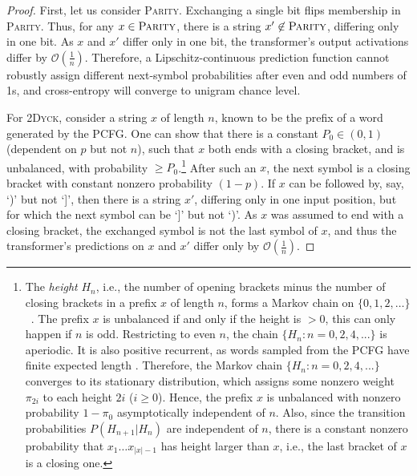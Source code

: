 \documentclass[11pt,a4paper]{article}
\begin{document}
\begin{proof}
First, let us consider \textsc{Parity}.
Exchanging a single bit flips membership in \textsc{Parity}.
Thus, for any $x \in \textsc{Parity}$, there is a string $x' \not\in \textsc{Parity}$, differing only in one bit.
As $x$ and $x'$ differ only in one bit, the transformer's output activations differ by $\mathcal{O}(\frac{1}{n})$.
Therefore, a Lipschitz-continuous prediction function cannot robustly assign different next-symbol probabilities after even and odd numbers of 1s, and cross-entropy will converge to unigram chance level.

For \textsc{2Dyck}, consider a string $x$ of length $n$, known to be the prefix of a word generated by the PCFG.
One can show that there is a constant $P_0 \in (0,1)$ (dependent on $p$ but not $n$), such that $x$ both ends with a closing bracket, and is unbalanced, with probability $\geq P_0$.\footnote{%
The \emph{height} $H_{n}$, i.e., the number of opening brackets minus the number of closing brackets in a prefix $x$ of length $n$, forms a Markov chain on $\{0, 1, 2, \dots\}$~\citep{keener1992limit}.
The prefix $x$ is unbalanced if and only if the height is $>0$, this can only happen if $n$ is odd.
Restricting to even $n$, the chain $\{H_{n} : n = 0, 2, 4, ...\}$ is aperiodic.
It is also positive recurrent, as words sampled from the PCFG have finite expected length \citep{skachkova2018closing}.
Therefore, the Markov chain $\{H_{n} : n = 0, 2, 4, ...\}$ converges to its stationary distribution, which assigns some nonzero weight $\pi_{2i}$ to each height  $2i$ ($i \geq 0$).
Hence, the prefix $x$ is unbalanced with nonzero probability $1-\pi_0$ asymptotically independent of $n$.
Also, since the transition probabilities $P(H_{n+1}|H_n)$ are independent of $n$, there is a constant nonzero probability that $x_1\dots x_{|x|-1}$ has height larger than $x$, i.e., the last bracket of $x$ is a closing one.}
After such an $x$, the next symbol is a closing bracket with constant nonzero probability $(1-p)$.
If $x$ can be followed by, say, `)' but not `]', then there is a string $x'$, differing only in one input position, but for which the next symbol can be `]' but not `)'.
As $x$ was assumed to end with a closing bracket, the exchanged symbol is not the last symbol of $x$, and thus the transformer's predictions on $x$ and $x'$ differ only by $\mathcal{O}(\frac{1}{n})$.

\end{proof}
\end{document}
